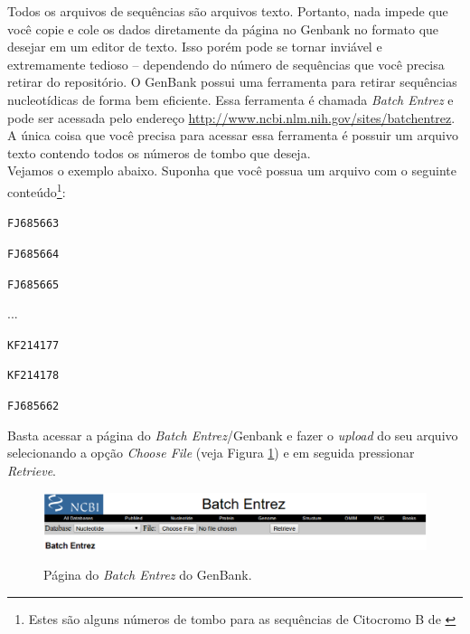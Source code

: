 \begin{refsection}
Todos os arquivos de sequências são arquivos texto. Portanto, nada impede que você copie e cole os dados diretamente da página no Genbank no formato que desejar em um editor de texto. Isso porém pode se tornar inviável e extremamente tedioso -- dependendo do número de sequências que você precisa retirar do repositório. O GenBank possui uma ferramenta para retirar sequências nucleotídicas de forma bem eficiente. Essa ferramenta é chamada \textit{Batch Entrez} e pode ser acessada pelo endereço \url{http://www.ncbi.nlm.nih.gov/sites/batchentrez}. A única coisa que você precisa para acessar essa ferramenta é possuir um arquivo texto contendo todos os números de tombo que deseja.\\

	Vejamos o exemplo abaixo. Suponha que você possua um arquivo com o seguinte conteúdo\footnote{ Estes são alguns números de tombo para as sequências de Citocromo B de \textcite{dias_et_al_2013}}:\\
\scriptsize

\noindent\texttt{FJ685663}

\noindent\texttt{FJ685664}

\noindent\texttt{FJ685665}


...


\noindent\texttt{KF214177}

\noindent\texttt{KF214178}

\noindent\texttt{FJ685662}

\normalsize

Basta acessar a página do \textit{Batch Entrez}/Genbank e fazer o \textit{upload} do seu arquivo selecionando a opção \textit{Choose File} (veja Figura \ref{tut7:fig:bacth_entrez}) e em seguida pressionar \textit{Retrieve}.

  \begin{figure}[H]
       \centering
      {\includegraphics[scale=0.5]{figures/tut7/entrez.eps}}
	{\caption[GenBnank \textit{Batch Entrez}]{Página do \textit{Batch Entrez} do GenBank.}\label{tut7:fig:bacth_entrez}}
  \end{figure}



\end{refsection}
